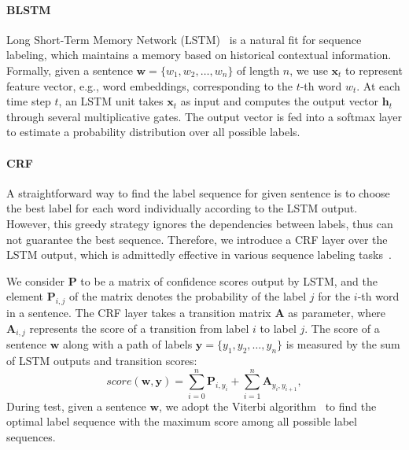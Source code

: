 \paragraph{BLSTM}
Long Short-Term Memory Network (LSTM)~\cite{hochreiter1997long} is a natural fit for sequence labeling, which maintains a memory based on historical contextual information. Formally, given a sentence $\bm{w} = \{w_1, w_2, \dots, w_n\}$ of length $n$, we use $\textbf{x}_t$ to represent feature vector, e.g., word embeddings, corresponding to the $t$-th word $w_t$. At each time step $t$, an LSTM unit takes $\textbf{x}_t$ as input and computes the output vector $\textbf{h}_t$ through several multiplicative gates. The output vector is fed into a softmax layer to estimate a probability distribution over all possible labels.

\paragraph{CRF}
A straightforward way to find the label sequence for given sentence is to choose the 
best label for each word individually according to the LSTM output.  
However, this greedy strategy ignores the dependencies between labels, thus can not guarantee the best sequence.  %
Therefore, we introduce a CRF layer over the LSTM output, which is admittedly effective in various sequence labeling tasks~\cite{collobert2011natural,huang2015bidirectional}. %

We consider $\textbf{P}$ to be a matrix of confidence scores output by LSTM, and the element $\textbf{P}_{i,j}$ of the matrix denotes the probability of the label $j$ for the $i$-th word in a sentence. The CRF layer takes a transition matrix $\textbf{A}$ as parameter, where $\textbf{A}_{i,j}$ represents the score of a transition from label $i$ to label $j$. The score of a sentence $\bm{w}$ along with a path of labels $\bm{y} = \{y_1, y_2, \ldots, y_n\}$ is measured by the sum of LSTM outputs and transition scores: 
\begin{equation}
	score(\bm{w}, \bm{y}) = \sum\limits_{i=0}^n\textbf{P}_{i, y_i} + \sum\limits_{i=1}^n\textbf{A}_{y_i, y_{i+1}},
\end{equation}
During test, given a sentence $\bm{w}$, we adopt the Viterbi algorithm~\cite{rabiner1989tutorial} to find the optimal label sequence with the maximum score among all possible label sequences.

